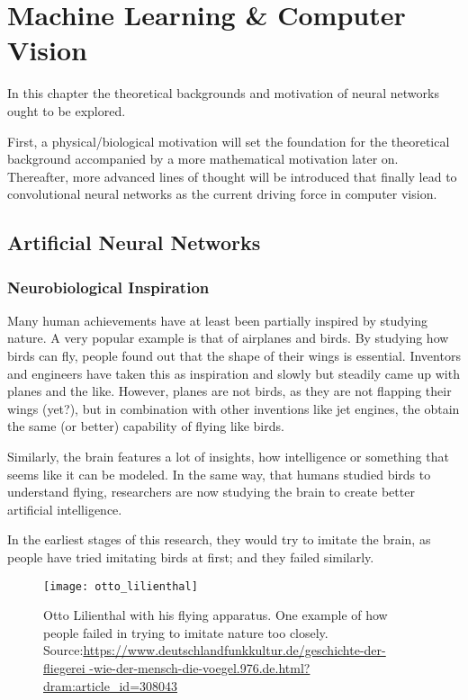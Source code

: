 \setchapterpreamble[u]{\margintoc}
\chapter{Machine Learning \& Computer Vision}
In this chapter the theoretical backgrounds and motivation of neural networks ought to be explored.

First, a physical/biological motivation will set the foundation for the theoretical background accompanied by a more mathematical motivation later on.
Thereafter, more advanced lines of thought will be introduced that finally lead to convolutional neural networks as the current driving force in computer vision.

\section{Artificial Neural Networks}

\subsection[Inspiration]{Neurobiological Inspiration}

Many human achievements have at least been partially inspired by studying nature.
A very popular example is that of airplanes and birds.
By studying how birds can fly, people found out that the shape of their wings is essential.
Inventors and engineers have taken this as inspiration and slowly but steadily came up with planes and the like.
However, planes are not birds, as they are not flapping their wings (yet?), but in combination with other inventions like jet engines, the obtain the same (or better) capability of flying like birds.

Similarly, the brain features a lot of insights, how intelligence or something that seems like it can be modeled.
In the same way, that humans studied birds to understand flying, researchers are now studying the brain to create better artificial intelligence.

In the earliest stages of this research, they would try to imitate the brain, as people have tried imitating birds at first; and they failed similarly.
\begin{figure}
    \texttt{[image: otto\_lilienthal]}
    \caption[]{Otto Lilienthal with his flying apparatus. One example of how people failed in trying to imitate nature too closely. Source:\url{https://www.deutschlandfunkkultur.de/geschichte-der-fliegerei -wie-der-mensch-die-voegel.976.de.html?dram:article_id=308043}}
\end{figure}

